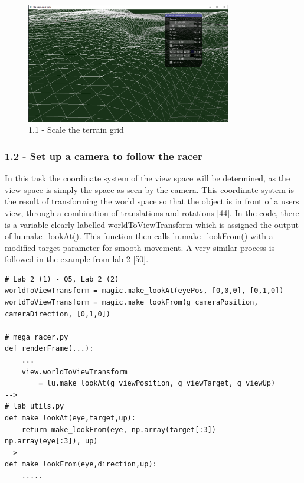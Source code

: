 \documentclass[a4 paper, 12pt]{article}
\begin{document}
    \begin{figure} [H]
        \centering
        \includegraphics[width=0.8\textwidth, frame]
            {./images/mega_racer/1.1.PNG}
        \caption{1.1 - Scale the terrain grid}
    \end{figure}  
   

\subsubsection{1.2 - Set up a camera to follow the racer}
In this task the coordinate system of the view space will be determined, as the view space is simply the space as seen by the camera. This coordinate system is the result of transforming the world space so that the object is in front of a users view, through a combination of translations and rotations [44]. In the code, there is a variable clearly labelled worldToViewTransform which is assigned the output of lu.make\_lookAt(). This function then calls lu.make\_lookFrom() with a modified target parameter for smooth movement. A very similar process is followed in the example from lab 2 [50]. 
    \begin{lstlisting}
# Lab 2 (1) - Q5, Lab 2 (2) 
worldToViewTransform = magic.make_lookAt(eyePos, [0,0,0], [0,1,0])
worldToViewTransform = magic.make_lookFrom(g_cameraPosition, cameraDirection, [0,1,0])

# mega_racer.py 
def renderFrame(...):
    ...
    view.worldToViewTransform 
        = lu.make_lookAt(g_viewPosition, g_viewTarget, g_viewUp)
-->
# lab_utils.py
def make_lookAt(eye,target,up):
    return make_lookFrom(eye, np.array(target[:3]) - np.array(eye[:3]), up)
--> 
def make_lookFrom(eye,direction,up):
    .....
    \end{lstlisting}
\end{document}

